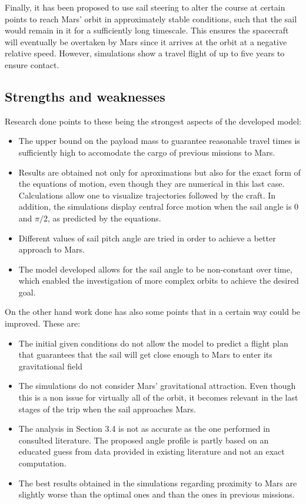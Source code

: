 \documentclass[twocolumn,12pt,a4paper]{article}
\numberwithin{equation}{section}
\begin{document}
Finally, it has been proposed to use sail steering to alter the course at certain points to reach Mars' orbit in approximately stable conditions, such that the sail would remain in it for a sufficiently long timescale. This ensures the spacecraft will eventually be overtaken by Mars since it arrives at the orbit at a negative relative speed. However, simulations show a travel flight of up to five years to ensure contact. 

\subsection{Strengths and weaknesses}
Research done points to these being the strongest aspects of the developed model:
\begin{itemize}
\item The upper bound on the payload mass to guarantee reasonable travel times is sufficiently high to accomodate the cargo of previous missions to Mars. 
\item Results are obtained not only for aproximations but also for the exact form of the equations of motion, even though they are numerical in this last case. Calculations allow one to visualize trajectories followed by the craft. In addition, the simulations display central force motion when the sail angle is 0 and \( \pi/2 \), as predicted by the equations.
\item Different values of sail pitch angle are tried in order to achieve a better approach to Mars. 
\item The model developed allows for the sail angle to be non-constant over time, which enabled the investigation of more complex orbits to achieve the desired goal.
\end{itemize}
On the other hand work done has also some points that in a certain way could be improved. These are:
\begin{itemize}
	\item The initial given conditions do not allow the model to predict a flight plan that guarantees that the sail will get close enough to Mars to enter its gravitational field
	\item The simulations do not consider Mars' gravitational attraction. Even though this  is a non issue for virtually all of the orbit, it becomes relevant in the last stages of the trip when the sail approaches Mars.
	\item The analysis in Section 3.4 is not as accurate as the one performed in consulted literature. The proposed angle profile is partly based on an educated guess from data provided in existing literature and not an exact computation.
	\item The best results obtained in the simulations regarding proximity to Mars are slightly worse than the optimal ones and than the ones in previous missions. 
\end{itemize}
\end{document}
